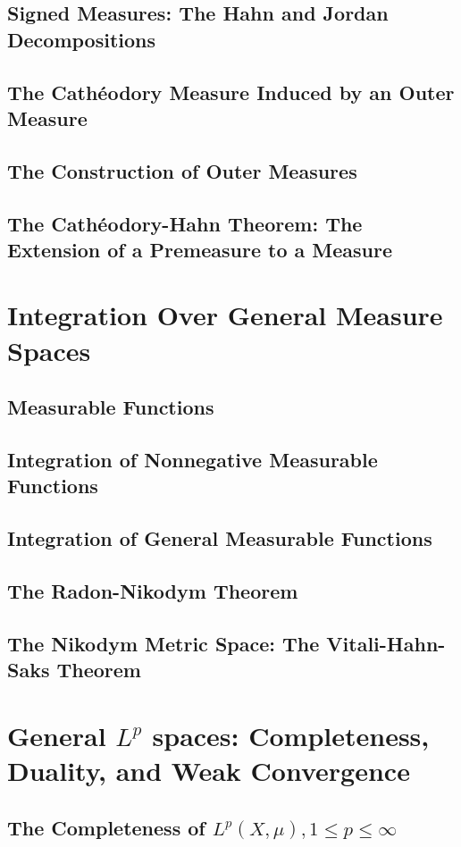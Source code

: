 \documentclass[a4paper,10pt]{book}
\theoremstyle{plain} %
\begin{document}
\section{Signed Measures: The Hahn and Jordan Decompositions}
\section{The Cath\'eodory Measure Induced by an Outer Measure}
\section{The Construction of Outer Measures}
\section{The Cath\'eodory-Hahn Theorem: The Extension of a Premeasure to a Measure}

\chapter{Integration Over General Measure Spaces}

\section{Measurable Functions}
\section{Integration of Nonnegative Measurable Functions}
\section{Integration of General Measurable Functions}
\section{The Radon-Nikodym Theorem}
\section{The Nikodym Metric Space: The Vitali-Hahn-Saks Theorem}

\chapter{General $L^p$ spaces: Completeness, Duality, and Weak Convergence}

\section{The Completeness of $L^p(X,\mu),1\le p \le \infty$}
\end{document}
